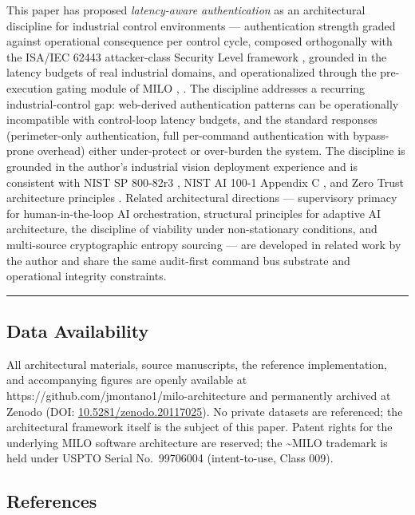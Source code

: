 This paper has proposed \emph{latency-aware authentication} as an
architectural discipline for industrial control environments ---
authentication strength graded against operational consequence per
control cycle, composed orthogonally with the ISA/IEC 62443
attacker-class Security Level framework \cite{ref1}, grounded in the latency
budgets of real industrial domains, and operationalized through the
pre-execution gating module of MILO \cite{ref3}, \cite{ref7}. The discipline
addresses a recurring industrial-control gap: web-derived authentication
patterns can be operationally incompatible with control-loop latency
budgets, and the standard responses (perimeter-only authentication, full
per-command authentication with bypass-prone overhead) either
under-protect or over-burden the system. The discipline is grounded in
the author's industrial vision deployment experience and is consistent
with NIST SP 800-82r3 \cite{ref2}, NIST AI 100-1 Appendix C \cite{ref11}, and
Zero Trust architecture principles \cite{ref6}. Related architectural
directions --- supervisory primacy for human-in-the-loop AI
orchestration, structural principles for adaptive AI architecture, the
discipline of viability under non-stationary conditions, and
multi-source cryptographic entropy sourcing --- are developed in related
work by the author and share the same audit-first command bus substrate
and operational integrity constraints.

\begin{center}\rule{0.5\linewidth}{0.5pt}\end{center}

\subsection{Data Availability}\label{data-availability}

All architectural materials, source manuscripts, the reference
implementation, and accompanying figures are openly available at
https://github.com/jmontano1/milo-architecture and permanently archived
at Zenodo (DOI:
\href{https://doi.org/10.5281/zenodo.20117025}{10.5281/zenodo.20117025}).
No private datasets are referenced; the architectural framework itself
is the subject of this paper. Patent rights for the underlying MILO
software architecture are reserved; the \textasciitilde MILO trademark
is held under USPTO Serial No.~99706004 (intent-to-use, Class 009).

\subsection{References}\label{references}


